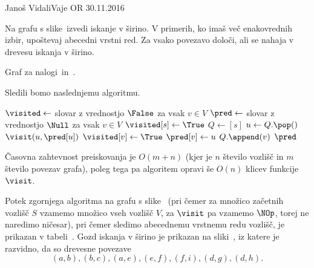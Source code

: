 \begin{naloga}{Janoš Vidali}{Vaje OR 30.11.2016}
\begin{vprasanje}
Na grafu s slike~\fig izvedi iskanje v širino.
V primerih, ko imaš več ena\-ko\-vred\-nih izbir,
upoštevaj abecedni vrstni red.
Za vsako povezavo določi, ali se nahaja v drevesu iskanja v širino.

\begin{slika}
\pgfslika
\caption{Graf za nalogi~\nal in~\nal[dfs].}
\end{slika}
\end{vprasanje}

\begin{odgovor}
Sledili bomo naslednjemu algoritmu.
\begin{small}
\begin{algorithmic}
    \State $\visited \gets$ slovar z vrednostjo $\False$ za vsak $v \in V$
    \State $\pred \gets$ slovar z vrednostjo $\Null$ za vsak $v \in V$
		\If{$\lnot \visited[s]$}
			\State $\visited[s] \gets \True$
			\State $Q \gets [s]$
				\State $u \gets Q.\pop()$
                \State $\visit(u, \pred[u])$
					\If{$\lnot \visited[v]$}
						\State $\visited[v] \gets \True$
						\State $\pred[v] \gets u$
						\State $Q.\append(v)$
					\EndIf
				\EndFor
			\EndWhile
		\EndIf
	\EndFor
    \State \Return $\pred$
\EndFunction
\end{algorithmic}
\end{small}
Časovna zahtevnost preiskovanja je $O(m + n)$
(kjer je $n$ število vozlišč in $m$ število povezav grafa),
poleg tega pa algoritem opravi še $O(n)$ klicev funkcije $\visit$.

Potek zgornjega algoritma na grafu s slike~\fig
(pri čemer za množico začetnih vozlišč $S$
vzamemo množico vseh vozlišč $V$,
za $\visit$ pa vzamemo $\NOp$, torej ne naredimo ničesar),
pri čemer sledimo abecednemu vrstnemu redu vozlišč,
je prikazan v tabeli~\tab.
Gozd iskanja v širino je prikazan na sliki~,
iz katere je razvidno, da so drevesne povezave
$$
(a, b), (b, c), (a, e), (e, f), (f, i), (d, g), (d, h).
$$


\end{odgovor}
\end{naloga}
